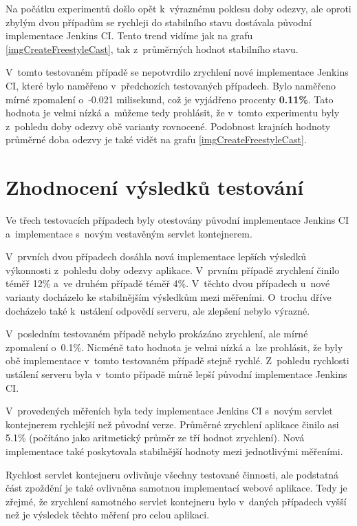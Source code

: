             Na počátku experimentů došlo opět k~výraznému poklesu doby odezvy, ale oproti
            zbylým dvou případům se rychleji do stabilního stavu dostávala původní implementace Jenkins CI.
            Tento trend vidíme jak na grafu \ref{imgCreateFreestyleCast}, tak z~průměrných
            hodnot stabilního stavu.

            V~tomto testovaném případě se nepotvrdilo zrychlení nové implementace Jenkins CI,
            které bylo naměřeno v~předchozích testovaných případech. Bylo naměřeno
            mírné zpomalení o~-0.021 milisekund, což je vyjádřeno procenty \textbf{0.11\%}.
            Tato hodnota je velmi nízká a~můžeme tedy prohlásit, že v~tomto experimentu
            byly z~pohledu doby odezvy obě varianty rovnocené.
            Podobnost krajních hodnoty průměrné doba odezvy je také vidět na grafu \ref{imgCreateFreestyleCast}.


    \section{Zhodnocení výsledků testování} \label{kapPerfVysledky}
        Ve třech testovacích případech byly otestovány původní implementace Jenkins CI
        a~implementace s~novým vestavěným servlet kontejnerem.

        V~prvních dvou případech dosáhla nová implementace lepších výsledků
        výkonnosti z~pohledu doby odezvy aplikace. V~prvním případě zrychlení činilo téměř 12\%
        a~ve druhém případě téměř 4\%. V~těchto dvou případech u~nové varianty
        docházelo ke stabilnějším výsledkům mezi měřeními. O~trochu dříve docházelo
        také k~ustálení odpovědí serveru, ale zlepšení nebylo výrazné.

        V~posledním testovaném případě nebylo prokázáno zrychlení, ale mírné zpomalení
        o~0.1\%. Nicméně tato hodnota je velmi nízká a~lze prohlásit, že
        byly obě implementace v~tomto testovaném případě stejně rychlé. 
        Z~pohledu rychlosti ustálení serveru byla v~tomto případě mírně lepší původní
        implementace Jenkins CI.

        \medskip
        V~provedených měřeních byla tedy implementace Jenkins CI s~novým
        servlet kontejnerem rychlejší než původní verze. Průměrné zrychlení
        aplikace činilo asi 5.1\% (počítáno jako aritmetický průměr ze tří hodnot zrychlení).
        Nová implementace také poskytovala stabilnější hodnoty mezi jednotlivými měřeními.

        Rychlost servlet kontejneru ovlivňuje všechny testované činnosti, ale podstatná část
        zpoždění je také ovlivněna samotnou implementací webové aplikace. Tedy je zřejmé, 
        že zrychlení samotného servlet kontejneru bylo v~daných případech vyšší než
        je výsledek těchto měření pro celou aplikaci.

